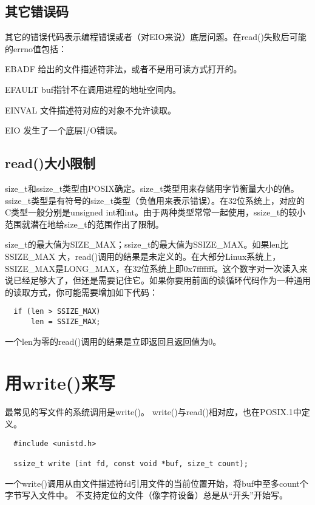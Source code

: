 \subsection{其它错误码}
其它的错误代码表示编程错误或者（对EIO来说）底层问题。在read()失败后可能的errno值包括： 

\begin{eqlist*}
\item [EBADF]
给出的文件描述符非法，或者不是用可读方式打开的。 
\item [EFAULT]
buf指针不在调用进程的地址空间内。
\item [EINVAL]
文件描述符对应的对象不允许读取。 
\item [EIO]
发生了一个底层I/O错误。
\end{eqlist*}

\subsection{read()大小限制}
size\_t和ssize\_t类型由POSIX确定。size\_t类型用来存储用字节衡量大小的值。ssize\_t类型是有符号的size\_t类型（负值用来表示错误）。在32位系统上，对应的C类型一般分别是unsigned int和int。由于两种类型常常一起使用，ssize\_t的较小范围就潜在地给size\_t的范围作出了限制。

size\_t的最大值为SIZE\_MAX；ssize\_t的最大值为SSIZE\_MAX。如果len比SSIZE\_MAX 大，read()调用的结果是未定义的。在大部分Linux系统上，SSIZE\_MAX是LONG\_MAX，在32位系统上即0x7fffffff。这个数字对一次读入来说已经足够大了，但还是需要记住它。如果你要用前面的读循环代码作为一种通用的读取方式，你可能需要增加如下代码：

\begin{lstlisting}
  if (len > SSIZE_MAX)
      len = SSIZE_MAX;
\end{lstlisting}

一个len为零的read()调用的结果是立即返回且返回值为0。 

\section{用write()来写}

最常见的写文件的系统调用是write()。 write()与read()相对应，也在POSIX.1中定义。 

\begin{lstlisting}
  #include <unistd.h>

  ssize_t write (int fd, const void *buf, size_t count);
\end{lstlisting}

一个write()调用从由文件描述符fd引用文件的当前位置开始，将buf中至多count个字节写入文件中。 不支持定位的文件（像字符设备）总是从“开头”开始写。

